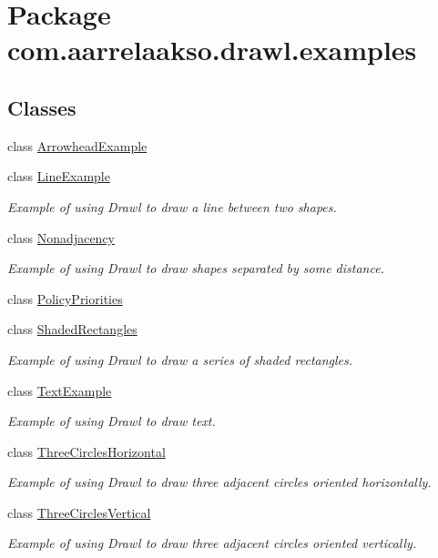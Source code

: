 \hypertarget{namespacecom_1_1aarrelaakso_1_1drawl_1_1examples}{}\section{Package com.\+aarrelaakso.\+drawl.\+examples}
\label{namespacecom_1_1aarrelaakso_1_1drawl_1_1examples}
\subsection*{Classes}
\begin{DoxyCompactItemize}
\item 
class \hyperlink{classcom_1_1aarrelaakso_1_1drawl_1_1examples_1_1_arrowhead_example}{Arrowhead\+Example}
\item 
class \hyperlink{classcom_1_1aarrelaakso_1_1drawl_1_1examples_1_1_line_example}{Line\+Example}
\begin{DoxyCompactList}\small\item\em Example of using Drawl to draw a line between two shapes. \end{DoxyCompactList}\item 
class \hyperlink{classcom_1_1aarrelaakso_1_1drawl_1_1examples_1_1_nonadjacency}{Nonadjacency}
\begin{DoxyCompactList}\small\item\em Example of using Drawl to draw shapes separated by some distance. \end{DoxyCompactList}\item 
class \hyperlink{classcom_1_1aarrelaakso_1_1drawl_1_1examples_1_1_policy_priorities}{Policy\+Priorities}
\item 
class \hyperlink{classcom_1_1aarrelaakso_1_1drawl_1_1examples_1_1_shaded_rectangles}{Shaded\+Rectangles}
\begin{DoxyCompactList}\small\item\em Example of using Drawl to draw a series of shaded rectangles. \end{DoxyCompactList}\item 
class \hyperlink{classcom_1_1aarrelaakso_1_1drawl_1_1examples_1_1_text_example}{Text\+Example}
\begin{DoxyCompactList}\small\item\em Example of using Drawl to draw text. \end{DoxyCompactList}\item 
class \hyperlink{classcom_1_1aarrelaakso_1_1drawl_1_1examples_1_1_three_circles_horizontal}{Three\+Circles\+Horizontal}
\begin{DoxyCompactList}\small\item\em Example of using Drawl to draw three adjacent circles oriented horizontally. \end{DoxyCompactList}\item 
class \hyperlink{classcom_1_1aarrelaakso_1_1drawl_1_1examples_1_1_three_circles_vertical}{Three\+Circles\+Vertical}
\begin{DoxyCompactList}\small\item\em Example of using Drawl to draw three adjacent circles oriented vertically. \end{DoxyCompactList}\end{DoxyCompactItemize}
